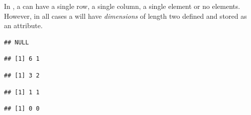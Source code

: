 \documentclass[krantz2]{krantz}\usepackage{knitr}%
\begin{document}
\begin{explainbox}
In \Rlang, a  can have a single row, a single column, a single element or no elements. However, in all cases a  will have \emph{dimensions} of length two defined and stored as an attribute.

\begin{knitrout}\footnotesize
{}\color{fgcolor}\begin{kframe}
\begin{alltt}
 \hlkwb{<-} \hlopt{:}
\end{alltt}
\begin{verbatim}
## NULL
\end{verbatim}
\end{kframe}
\end{knitrout}

\begin{knitrout}\footnotesize
{}\color{fgcolor}\begin{kframe}
\begin{alltt}
 \hlkwb{<-} \hlstd{(}\hlopt{:}\hlstd{,}  \hlstd{=} \hlstd{)}
\end{alltt}
\begin{verbatim}
## [1] 6 1
\end{verbatim}
\begin{alltt}
 \hlkwb{<-} \hlstd{(}\hlopt{:}\hlstd{,}  \hlstd{=} \hlstd{)}
\end{alltt}
\begin{verbatim}
## [1] 3 2
\end{verbatim}
\begin{alltt}
 \hlkwb{<-} \hlstd{(}\hlstd{,}  \hlstd{=} \hlstd{)}
\end{alltt}
\begin{verbatim}
## [1] 1 1
\end{verbatim}
\begin{alltt}
 \hlkwb{<-} \hlstd{(}\hlstd{(),}  \hlstd{=} \hlstd{)}
\end{alltt}
\begin{verbatim}
## [1] 0 0
\end{verbatim}
\end{kframe}
\end{knitrout}

\end{explainbox}
\end{document}
